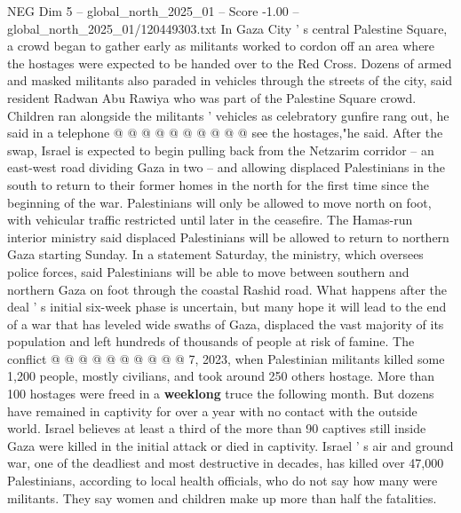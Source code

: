 \begin{textsample}{NEG Dim 5 – global\_north\_2025\_01 – Score -1.00 – global\_north\_2025\_01/120449303.txt}
In Gaza City ' s central Palestine Square, a crowd began to gather early as militants worked to cordon off an area where the hostages were expected to be handed over to the Red Cross.
Dozens of armed and masked militants also paraded in vehicles through the streets of the city, said resident Radwan Abu Rawiya who was part of the Palestine Square crowd.
Children ran alongside the militants ' vehicles as celebratory gunfire rang out, he said in a telephone @ @ @ @ @ @ @ @ @ @ see the hostages,"he said.
After the swap, Israel is expected to begin pulling back from the Netzarim corridor -- an east-west road dividing Gaza in two -- and allowing displaced Palestinians in the south to return to their former homes in the north for the first time since the beginning of the war.
Palestinians will only be allowed to move north on foot, with vehicular traffic restricted until later in the ceasefire.
The Hamas-run interior ministry said displaced Palestinians will be allowed to return to northern Gaza starting Sunday.
In a statement Saturday, the ministry, which oversees police forces, said Palestinians will be able to move between southern and northern Gaza on foot through the coastal Rashid road.
What happens after the deal ' s initial six-week phase is uncertain, but many hope it will lead to the end of a war that has leveled wide swaths of Gaza, displaced the vast majority of its population and left hundreds of thousands of people at risk of famine.
The conflict @ @ @ @ @ @ @ @ @ @ 7, 2023, when Palestinian militants killed some 1,200 people, mostly civilians, and took around 250 others hostage.
More than 100 hostages were freed in a \textbf{weeklong} truce the following month.
But dozens have remained in captivity for over a year with no contact with the outside world.
Israel believes at least a third of the more than 90 captives still inside Gaza were killed in the initial attack or died in captivity.
Israel ' s air and ground war, one of the deadliest and most destructive in decades, has killed over 47,000 Palestinians, according to local health officials, who do not say how many were militants.
They say women and children make up more than half the fatalities.

\end{textsample}
